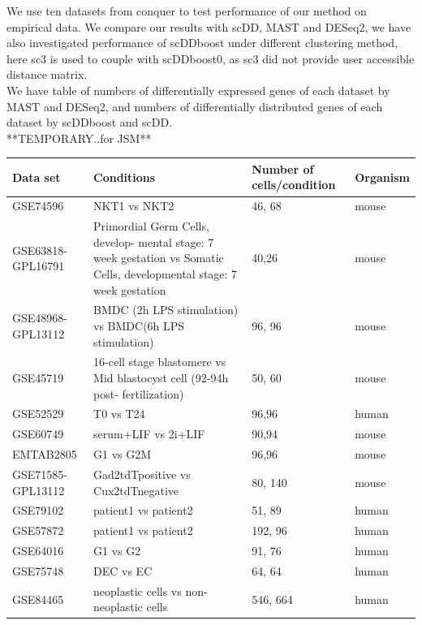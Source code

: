 \documentclass[11pt]{amsart}
\begin{document}
We use ten datasets from conquer\cite{ref:Cq} to test performance of our method on empirical data. We compare our results with scDD\cite{ref:scDD}, MAST\cite{ref:MAST} and DESeq2\cite{ref:Des}, we have also investigated performance of scDDboost under different clustering method, here sc3\cite{sc3} is used to couple with scDDboost0, as sc3 did not provide user accessible distance matrix.\\

We have table of numbers of differentially expressed genes of each dataset by MAST and DESeq2, and numbers of differentially distributed genes of each dataset by scDDboost and scDD.\\

**TEMPORARY..for JSM**

\begin{table}[ht]
\small
\centering
\begin{tabular}{ |p{3cm}|p{5cm}|p{3cm}|p{1.5cm}|}
\hline
 Data set & Conditions & Number of cells/condition & Organism \\
 \hline
 \hline
 GSE74596 & NKT1 vs NKT2 & 46, 68 & mouse  \\
 \hline
 GSE63818-GPL16791 & Primordial Germ Cells, develop- mental stage: 7 week gestation vs Somatic Cells, developmental stage: 7 week gestation & 40,26 & mouse  \\
 \hline
 GSE48968-GPL13112 & BMDC (2h LPS stimulation) vs BMDC(6h LPS stimulation) & 96, 96 & mouse \\
 \hline
 GSE45719 & 16-cell stage blastomere vs Mid blastocyst cell (92-94h post- fertilization) & 50, 60 & mouse \\
 \hline
 GSE52529 & T0 vs T24 & 96,96 & human \\
 \hline
 GSE60749 & serum+LIF vs 2i+LIF & 90,94 & mouse\\
 \hline
 EMTAB2805 & G1 vs G2M & 96,96 & mouse \\
 \hline
 GSE71585-GPL13112 & Gad2tdTpositive vs Cux2tdTnegative & 80, 140 & mouse \\
 \hline
 GSE79102 & patient1 vs patient2 & 51, 89 & human\\
 \hline
 GSE57872 & patient1 vs patient2 & 192, 96 & human\\
 \hline
 GSE64016 & G1 vs G2 & 91, 76 & human\\
 \hline
GSE75748 & DEC vs EC & 64, 64 & human \\
\hline
GSE84465 & neoplastic cells vs non-neoplastic cells & 546, 664 & human \\
\end{tabular}
\end{table}
\hfill\\
\end{document}
